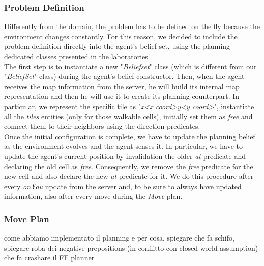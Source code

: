         \subsubsection{Problem Definition}
            Differently from the domain, the problem has to be defined on the fly because the environment changes constantly. For this reason, we decided to include the problem definition directly into the agent's belief set, using the planning dedicated classes presented in the laboratories.
            \medskip\\
            The first step is to instantiate a new "\textit{Beliefset}" class (which is different from our "\textit{BeliefSet}" class) during the agent's belief constructor. Then, when the agent receives the map information from the server, he will build its internal map representation and then he will use it to create its planning counterpart. In particular, we represent the specific tile as "\textit{x<x coord>y<y coord>}", instantiate all the \textit{tiles} entities (only for those walkable cells), initially set them as \textit{free} and connect them to their neighbors using the direction predicates.
            \medskip\\
            Once the initial configuration is complete, we have to update the planning belief as the environment evolves and the agent senses it. In particular, we have to update the agent's current position by invalidation the older \textit{at} predicate and declaring the old cell as \textit{free}. Consequently, we remove the \textit{free} predicate for the new cell and also declare the new \textit{at} predicate for it. We do this procedure after every \textit{onYou} update from the server and, to be sure to always have updated information, also after every move during the \textit{Move} plan.
        \subsubsection{Move Plan}

        come abbiamo implementato il planning e per cosa, spiegare che fa schifo, spiegare roba dei negative prepositions (in conflitto con closed world assumption) che fa crashare il FF planner
